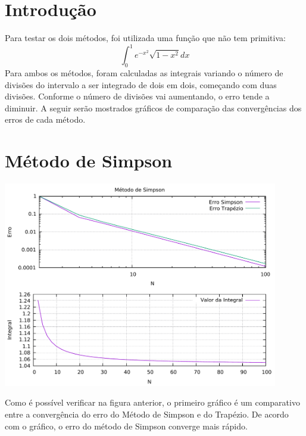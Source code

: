 \section{Introdu\c{c}\~ao}
Para testar os dois métodos, foi utilizada uma função que não tem primitiva:
$$ \int_{0}^{1} e^{-x^2}\sqrt{1-x^2} dx $$
Para ambos os métodos, foram calculadas as integrais variando o número de divisões do intervalo
a ser integrado de dois em dois, começando com duas divisões. Conforme o número de divisões vai
aumentando, o erro tende a diminuir. A seguir serão mostrados gráficos de comparação das
convergências dos erros de cada método.
\section{Método de Simpson}
\begin{center}
    \includegraphics[width=12cm]{simpson.pdf}
\end{center}
Como é possível verificar na figura anterior, o primeiro gráfico é um comparativo entre
a convergência do erro do Método de Simpson e do Trapézio. De acordo com o gráfico, o erro
do método de Simpson converge mais rápido.

